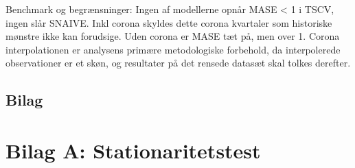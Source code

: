 \documentclass[
  danish,
]{article}
\begin{document}
Benchmark og begrænsninger: Ingen af modellerne opnår MASE \textless{} 1
i TSCV, ingen slår SNAIVE. Inkl corona skyldes dette corona kvartaler
som historiske mønstre ikke kan forudsige. Uden corona er MASE tæt på,
men over 1. Corona interpolationen er analysens primære metodologiske
forbehold, da interpolerede observationer er et skøn, og resultater på
det rensede datasæt skal tolkes derefter.

\newpage

\subsection{Bilag}\label{bilag}

\appendix

\section*{Bilag A: Stationaritetstest}\label{sec-bilag-a}
\end{document}
